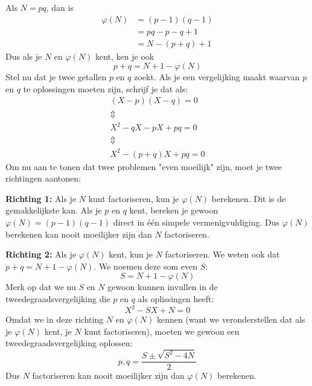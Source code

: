 Als $N = pq$, dan is
\begin{equation*}
    \begin{aligned}
        \varphi(N) &= (p-1)(q-1) \\
        &= pq - p - q +1 \\
        &= N - (p + q) + 1
    \end{aligned}
\end{equation*}
Dus als je $N$ en $\varphi(N)$ kent, ken je ook
\begin{equation*}
    p + q = N + 1 - \varphi(N)
\end{equation*}
Stel nu dat je twee getallen $p$ en $q$ zoekt. Als je een vergelijking maakt waarvan $p$ en $q$ te oplossingen moeten zijn, schrijf je dat als:
\begin{equation*}
    \begin{gathered}
        (X-p)(X-q) = 0 \\
        \Updownarrow \\
        X^2 - qX - pX + pq = 0 \\
        \Updownarrow \\
        X^2 - (p+q)X + pq = 0
    \end{gathered}
\end{equation*}
Om nu aan te tonen dat twee problemen "even moeilijk" zijn, moet je twee richtingen aantonen:

\textbf{Richting 1:} Als je $N$ kunt factoriseren, kun je $\varphi(N)$ berekenen. Dit is de gemakkelijkste kan. Als je $p$ en $q$ kent, bereken je gewoon $\varphi(N) = (p-1)(q-1)$ direct in één simpele vermenigvuldiging. Dus $\varphi(N)$ berekenen kan nooit moeilijker zijn dan $N$ factoriseren.

\textbf{Richting 2:} Als je $\varphi(N)$ kent, kun je $N$ factoriseren. We weten ook dat $p + q = N + 1 - \varphi(N)$. We noemen deze som even $S$:
\begin{equation*}
    S = N + 1 - \varphi(N)
\end{equation*}
Merk op dat we nu $S$ en $N$ gewoon kunnen invullen in de tweedegraadsvergelijking die $p$ en $q$ als oplissingen heeft:
\begin{equation*}
    X^2 - SX + N = 0
\end{equation*}
Omdat we in deze richting $N$ en $\varphi(N)$ kennen (want we veronderstellen dat als je $\varphi(N)$ kent, je $N$ kunt factoriseren), moeten we gewoon een tweedegraadsvergelijking oplossen:
\begin{equation*}
    p,q = \frac{S \pm \sqrt{S^2 - 4N}}{2}
\end{equation*}
Dus $N$ factoriseren kan nooit moeilijker zijn dan $\varphi(N)$ berekenen.

